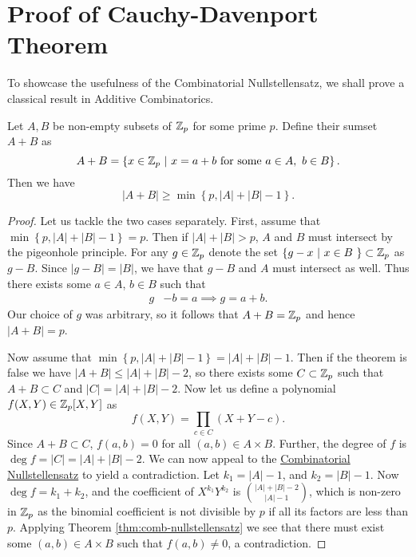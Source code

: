 \section{Proof of Cauchy-Davenport Theorem}
To showcase the usefulness of the Combinatorial Nullstellensatz, we shall prove a classical result in Additive Combinatorics. 
\begin{theorem}  \label{thm:C-D}
    Let $A,B$ be non-empty subsets of $\mathbb Z_p$ for some prime $p$. Define their sumset $A+B$ as 
    \[
    A + B = 
    \left\{ x \in \mathbb Z_p\ | \ x = a+b \text{  for some } a\in A, \ b \in B \right\}.
    \]
    Then we have
    \[
    |A+B| \geq  \min \left\{p, |A| + |B| -1 \right\}.
    \]
\end{theorem}

\begin{proof}
    Let us tackle the two cases separately. First, assume that $\min \left\{p, |A| + |B| -1 \right\} = p$.
    Then if $|A| + |B| > p$, $A$ and $B$ must intersect by the pigeonhole principle.
    For any $g \in \mathbb Z_p$ denote the set  $\left\{ g - x  \ | \ x \in B \  \right\} \subset \mathbb Z_p$ as $g-B$. Since $|g-B| = |B|$, we have that 
    $g-B$ and $A$ must intersect as well. Thus there exists some $a \in A$, $b \in B$ such that
    \begin{align*}
        g& -b = a \implies g = a+b.
    \end{align*}
    Our choice of $g$ was arbitrary, so it follows that $A+B = \mathbb Z_p$ and hence $|A+B| = p$.

    Now assume that $\min \left\{p, |A| + |B| -1 \right\} = |A| + |B| -1$. Then if the theorem is false we have $|A+B| \leq |A| + |B| -2$, so there exists some $C \subset \mathbb Z_p$ such that 
    $A+B \subset C$ and $|C| =  |A| + |B| -2$. Now let us define a polynomial $f(X,Y) \in \mathbb Z_p [X,Y]$ as
    \[
        f(X,Y) = \prod_{c \in C} (X+Y -c).
    \]
    Since $A+B \subset C$, $f(a,b) =0$ for all $(a,b) \in A\times B$. Further, the degree of $f$ is $\deg f = |C| = |A| + |B| -2$. 
    We can now appeal to the \hyperref[thm:comb-nullstellensatz]{Combinatorial Nullstellensatz} to yield a contradiction. Let $k_1 = |A| -1$, and $k_2 = |B|-1$. 
    Now $\deg f = k_1 + k_2$, and the coefficient of $X^{k_1}Y^{k_2}$ is
    ${|A|+|B| - 2} \choose {|A|- 1}$, which is non-zero in $\mathbb Z_p$ as the binomial coefficient is not divisible by $p$ if all its factors are less than $p$. Applying Theorem \ref{thm:comb-nullstellensatz} we see that there 
    must exist some $(a,b) \in A \times B$ such that $f(a,b) \neq 0$, a contradiction.
\end{proof}

